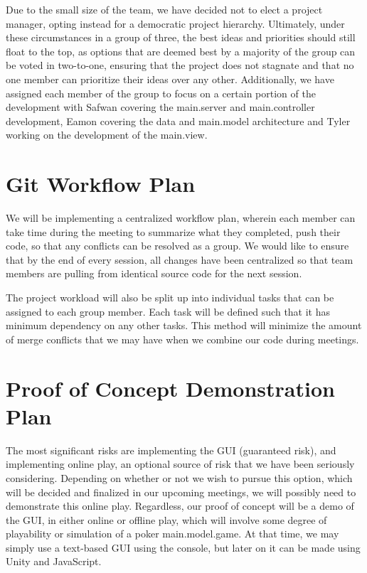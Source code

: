 \documentclass{article}
\begin{document}
Due to the small size of the team, we have decided not to elect a project manager, opting instead for a democratic project hierarchy. Ultimately, under these circumstances in a group of three, the best ideas and priorities should still float to the top, as options that are deemed best by a majority of the group can be voted in two-to-one, ensuring that the project does not stagnate and that no one member can prioritize their ideas over any other. Additionally, we have assigned each member of the group to focus on a certain portion of the development with Safwan covering the main.server and main.controller development, Eamon covering the data and main.model architecture and Tyler working on the development of the main.view.

\section{Git Workflow Plan}

We will be implementing a centralized workflow plan, wherein each member can take time during the meeting to summarize what they completed, push their code, so that any conflicts can be resolved as a group. We would like to ensure that by the end of every session, all changes have been centralized so that team members are pulling from identical source code for the next session.

The project workload will also be split up into individual tasks that can be assigned to each group member. Each task will be defined such that it has minimum dependency on any other tasks. This method will minimize the amount of merge conflicts that we may have when we combine our code during meetings. 

\section{Proof of Concept Demonstration Plan}

The most significant risks are implementing the GUI (guaranteed risk), and implementing online play, an optional source of risk that we have been seriously considering. Depending on whether or not we wish to pursue this option, which will be decided and finalized in our upcoming meetings, we will possibly need to demonstrate this online play. Regardless, our proof of concept will be a demo of the GUI, in either online or offline play, which will involve some degree of playability or simulation of a poker main.model.game. At that time, we may simply use a text-based GUI using the console, but later on it can be made using Unity and JavaScript.
\end{document}
